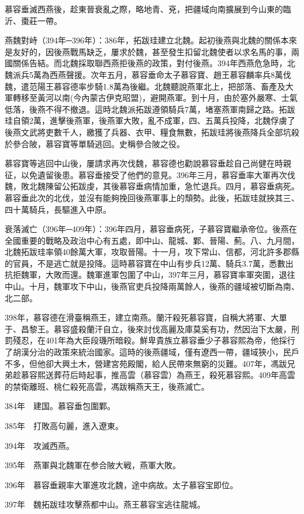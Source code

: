 慕容垂滅西燕後，趁東晉衰亂之際，略地青、兗，把疆域向南擴展到今山東的臨沂、棗莊一帶。

燕魏對峙（394年─396年）：386年，拓跋珪建立北魏。起初後燕與北魏的關係本來是友好的，因後燕戰馬缺乏，屢求於魏，甚至發生扣留北魏使者以求名馬的事，兩國關係告結。而北魏採取聯西燕拒後燕的政策，對付後燕。394年西燕危急時，北魏派兵5萬為西燕聲援。次年五月，慕容垂命太子慕容寶、趙王慕容麟率兵8萬伐魏，遣范陽王慕容德率步騎1.8萬為後繼。北魏聽說燕軍北上，把部落、畜產及大軍轉移至黃河以南(今內蒙古伊克昭盟)，避開燕軍。到十月，由於塞外嚴寒、士氣低落，後燕不得不撤退。這時北魏派拓跋遵領騎兵7萬，堵塞燕軍南歸之路。拓跋珪自領2萬，進擊後燕軍，後燕軍大敗，亂不成軍，四、五萬兵投降，北魏俘虜了後燕文武將吏數千人，繳獲了兵器、衣甲、糧食無數，拓跋珪將後燕降兵全部坑殺於參合陂，慕容寶等單騎逃回。史稱參合陂之役。

慕容寶等逃回中山後，屢請求再次伐魏，慕容德也勸說慕容垂趁自己尚健在時親征，以免遺留後患。慕容垂接受了他們的意見。396年三月，慕容垂率大軍再次伐魏，敗北魏陳留公拓跋虔，其後慕容垂病情加重，急忙退兵。四月，慕容垂病死。慕容垂此次的北伐，並沒有能夠挽回後燕軍事上的頹勢。此後，拓跋珪就挾其三、四十萬騎兵，長驅進入中原。

衰落滅亡（396年─409年）：396年四月，慕容垂病死，子慕容寶繼承帝位。後燕在全國重要的戰略及政治中心有五處，即中山、龍城、鄴、晉陽、薊。八、九月間，北魏拓跋珪率領40餘萬大軍，攻取晉陽。十一月，攻下常山、信都，河北許多郡縣的官員，不是逃亡就是投降。這時慕容寶在中山有步兵12萬、騎兵3.7萬，悉數出抗拒魏軍，大敗而還。魏軍進軍包圍了中山，397年三月，慕容寶率軍突圍，退往中山。十月，魏軍攻下中山，後燕官吏兵投降兩萬餘人，後燕的疆域被切斷為南、北二部。

398年，慕容德在滑臺稱燕王，建立南燕。蘭汗殺死慕容寶，自稱大將軍、大單于、昌黎王。慕容盛殺蘭汗自立，後來討伐高麗及庫莫奚有功，然因治下太嚴，刑罰殘忍，在401年為大臣段璣所暗殺。鮮卑貴族立慕容垂少子慕容熙為帝，他採行了胡漢分治的政策來統治國家。這時的後燕疆域，僅有遼西一帶，疆域狹小，民戶不多，但他卻大興土木，營建宮苑殿閣，給人民帶來無窮的災難。407年，馮跋兄弟趁慕容熙送葬苻后時起事，推高雲（慕容雲）為燕王，殺死慕容熙。409年高雲的禁衛離班、桃仁殺死高雲，馮跋稱燕天王，後燕滅亡。

384年　建国。慕容垂包圍鄴。

385年　打敗高句麗，進入遼東。

394年　攻滅西燕。

395年　燕軍與北魏軍在参合陂大戦，燕軍大敗。

396年　慕容垂親率大軍進攻北魏，途中病故。太子慕容宝即位。

397年　魏拓跋珪攻擊燕都中山。燕王慕容宝逃往龍城。


